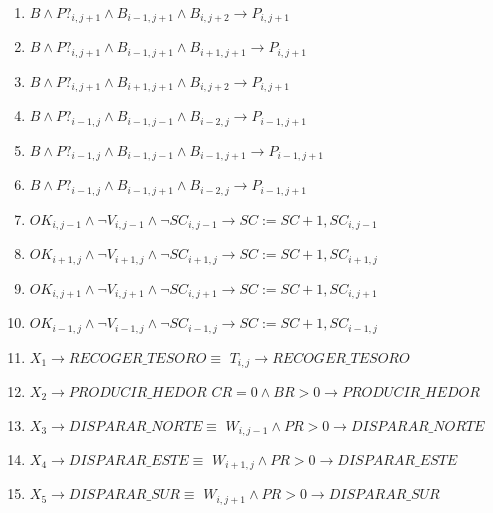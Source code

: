 \begin{enumerate}
    \item $B \land P?_{i, j+1} \land B_{i-1, j+1} \land B_{i, j+2} \longrightarrow P_{i, j+1}$
    \item $B \land P?_{i, j+1} \land B_{i-1, j+1} \land B_{i+1, j+1} \longrightarrow P_{i, j+1}$
    \item $B \land P?_{i, j+1} \land B_{i+1, j+1} \land B_{i, j+2} \longrightarrow P_{i, j+1}$
    
    \item $B \land P?_{i-1, j} \land B_{i-1, j-1} \land B_{i-2, j} \longrightarrow P_{i-1, j+1}$
    \item $B \land P?_{i-1, j} \land B_{i-1, j-1} \land B_{i-1, j+1} \longrightarrow P_{i-1, j+1}$
    \item $B \land P?_{i-1, j} \land B_{i-1, j+1} \land B_{i-2, j} \longrightarrow P_{i-1, j+1}$
    
    \item $OK_{i, j-1} \wedge \neg V_{i,j-1} \wedge \neg SC_{i, j-1} \longrightarrow SC := SC + 1, SC_{i,j-1}$
    \item $OK_{i+1, j} \wedge \neg V_{i+1,j} \wedge \neg SC_{i+1, j} \longrightarrow SC := SC + 1, SC_{i+1,j}$
    \item $OK_{i, j+1} \wedge \neg V_{i,j+1} \wedge \neg SC_{i, j+1} \longrightarrow SC := SC + 1, SC_{i,j+1}$
    \item $OK_{i-1, j} \wedge \neg V_{i-1,j} \wedge \neg SC_{i-1, j} \longrightarrow SC := SC + 1, SC_{i-1,j}$
\newline
    \item   $X_1 \longrightarrow RECOGER\_TESORO \equiv$
    \newline
    $T_{i, j} \longrightarrow RECOGER\_TESORO$

    \item $X_2 \longrightarrow PRODUCIR\_HEDOR$
    \newline
    $CR = 0 \land BR > 0 \longrightarrow PRODUCIR\_HEDOR$

    \item   $X_3 \longrightarrow DISPARAR\_NORTE \equiv$
    \newline
    $W_{i, j-1} \land PR > 0 \longrightarrow DISPARAR\_NORTE$

    \item   $X_4 \longrightarrow DISPARAR\_ESTE \equiv$
    \newline
    $W_{i+1, j} \land PR > 0 \longrightarrow DISPARAR\_ESTE$

    \item   $X_5 \longrightarrow DISPARAR\_SUR \equiv$
    \newline
    $W_{i, j+1} \land PR > 0 \longrightarrow DISPARAR\_SUR$


\end{enumerate}
